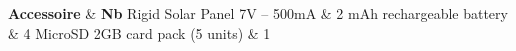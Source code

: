 \textbf{Accessoire}					&	\textbf{Nb}\tabularnewline\hline
Rigid Solar Panel 7V – 500mA		&	2 mAh rechargeable battery		&	4\tabularnewline
MicroSD 2GB card pack (5 units)		&	1\tabularnewline